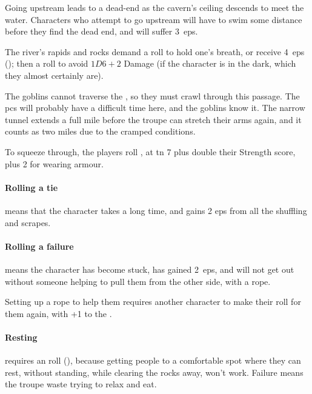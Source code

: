 \begin{multicols}{2}
Going upstream leads to a dead-end as the cavern's ceiling descends to meet the water.
Characters who attempt to go upstream will have to swim some distance before they find the dead end, and will suffer 3~\glspl{ep}.



The river's rapids and rocks demand a  roll to hold one's breath, or receive 4~\glspl{ep} (\tn[10]); then a  roll to avoid $1D6+2$ Damage (\tn[16] if the character is in the dark, which they almost certainly are).


The goblins cannot traverse the , so they must crawl through this passage.
The \glspl{pc} will probably have a difficult time here, and the goblins know it.
The narrow tunnel extends a full mile before the troupe can stretch their arms again, and it counts as two miles due to the cramped conditions.

To squeeze through, the players roll , at \gls{tn} 7 plus double their Strength score, plus 2 for wearing armour.

\paragraph{Rolling a tie}
means that the character takes a long time, and gains 2 \glspl{ep} from all the shuffling and scrapes.

\paragraph{Rolling a failure}
means the character has become stuck, has gained 2~\glspl{ep}, and will not get out without someone helping to pull them from the other side, with a rope.

Setting up a rope to help them requires another character to make their roll for them again, with +1 to the .


\paragraph{Resting}
requires an  roll (\tn[10]), because getting people to a comfortable spot where they can rest, without standing, while clearing the rocks away, won't work.
Failure means the troupe waste  trying to relax and eat.


\end{multicols}
